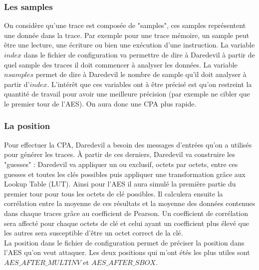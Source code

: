 \documentclass[10pt,a4paper]{article}
\begin{document}
\subsubsection{Les samples}
On considère qu'une trace est composée de "samples", ces samples représentent une donnée dans la trace. Par exemple pour une trace mémoire, un sample peut être une lecture, une écriture ou bien une exécution d'une instruction. La variable $index$ dans le fichier de configuration va permettre de dire à Daredevil à partir de quel sample des traces il doit commencer à analyser les données. La variable $nsamples$ permet de dire à Daredevil le nombre de sample qu'il doit analyser à partir d'$index$. L'intérêt que ces variables ont à être précisé est qu'on restreint la quantité de travail pour avoir une meilleure précision (par exemple ne cibler que le premier tour de l'AES). On aura donc une CPA plus rapide.

\subsubsection{La position}
Pour effectuer la CPA, Daredevil a besoin des messages d'entrées qu'on a utilisés pour générer les traces. À partir de ces derniers, Daredevil va construire les "guesses" : Daredevil va appliquer un ou exclusif, octets par octets, entre ces guesses et toutes les clés possibles puis appliquer une transformation grâce aux Lookup Table (LUT). Ainsi pour l'AES il aura simulé la première partie du premier tour pour tous les octets de clé possibles. Il calculera ensuite la corrélation entre la moyenne de ces résultats et la moyenne des données contenues dans chaque traces grâce au coefficient de Pearson. Un coefficient de corrélation sera affecté pour chaque octets de clé et celui ayant un coefficient plus élevé que les autres sera susceptible d'être un octet correct de la clé.\\
La position dans le fichier de configuration permet de préciser la position dans l'AES qu'on veut attaquer. Les deux positions qui m'ont étés les plus utiles sont $AES\_AFTER\_MULTINV$ et $AES\_AFTER\_SBOX$.
\end{document}
